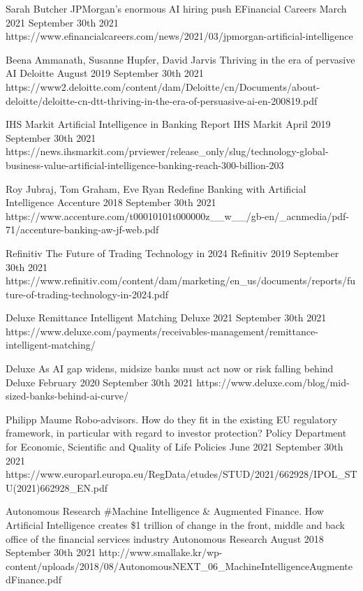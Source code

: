 \begin{thebibliography}{100}
{Sarah Butcher}
{JPMorgan's enormous AI hiring push}
{EFinancial Careers}
{March 2021}
{September 30th 2021}
{https://www.efinancialcareers.com/news/2021/03/jpmorgan-artificial-intelligence}

{Beena Ammanath, Susanne Hupfer, David Jarvis}
{Thriving in the era of pervasive AI}
{Deloitte}
{August 2019}
{September 30th 2021}
{https://www2.deloitte.com/content/dam/Deloitte/cn/Documents/about-deloitte/deloitte-cn-dtt-thriving-in-the-era-of-persuasive-ai-en-200819.pdf}

{IHS Markit}
{Artificial Intelligence in Banking Report}
{IHS Markit}
{April 2019}
{September 30th 2021}
{https://news.ihsmarkit.com/prviewer/release\_only/slug/technology-global-business-value-artificial-intelligence-banking-reach-300-billion-203}

{Roy Jubraj, Tom Graham, Eve Ryan}
{Redefine Banking with Artificial Intelligence}
{Accenture}
{2018}
{September 30th 2021}
{https://www.accenture.com/t00010101t000000z\_\_w\_\_/gb-en/\_acnmedia/pdf-71/accenture-banking-aw-jf-web.pdf}

{Refinitiv}
{The Future of Trading Technology in 2024}
{Refinitiv}
{2019}
{September 30th 2021}
{https://www.refinitiv.com/content/dam/marketing/en\_us/documents/reports/future-of-trading-technology-in-2024.pdf}

{Deluxe}
{Remittance Intelligent Matching}
{Deluxe}
{2021}
{September 30th 2021}
{https://www.deluxe.com/payments/receivables-management/remittance-intelligent-matching/}

{Deluxe}
{As AI gap widens, midsize banks must act now or risk falling behind}
{Deluxe}
{February 2020}
{September 30th 2021}
{https://www.deluxe.com/blog/mid-sized-banks-behind-ai-curve/}

{Philipp Maume}
{Robo-advisors. How do they fit in the existing EU regulatory framework, in particular with regard to investor protection?}
{Policy Department for Economic, Scientific and Quality of Life Policies}
{June 2021}
{September 30th 2021}
{https://www.europarl.europa.eu/RegData/etudes/STUD/2021/662928/IPOL\_STU(2021)662928\_EN.pdf}

{Autonomous Research}
{\#Machine Intelligence \& Augmented Finance. How Artificial Intelligence creates \$1 trillion of change in the front, middle and back office of the financial services industry}
{Autonomous Research}
{August 2018}
{September 30th 2021}
{http://www.smallake.kr/wp-content/uploads/2018/08/AutonomousNEXT\_06\_MachineIntelligenceAugmentedFinance.pdf}


\end{thebibliography}
